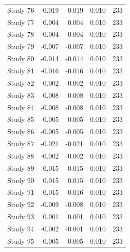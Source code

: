 \begin{table}[!h]
{\begin{tabular}[t]{rrrrr}
\hspace{1em}Study 76 & 0.019 & 0.019 & 0.010 & 233\\
\hspace{1em}Study 77 & 0.004 & 0.004 & 0.010 & 233\\
\hspace{1em}Study 78 & 0.004 & 0.004 & 0.010 & 233\\
\hspace{1em}Study 79 & -0.007 & -0.007 & 0.010 & 233\\
\hspace{1em}Study 80 & -0.014 & -0.014 & 0.010 & 233\\
\hspace{1em}Study 81 & -0.016 & -0.016 & 0.010 & 233\\
\hspace{1em}Study 82 & -0.002 & -0.002 & 0.010 & 233\\
\hspace{1em}Study 83 & 0.008 & 0.008 & 0.010 & 233\\
\hspace{1em}Study 84 & -0.008 & -0.008 & 0.010 & 233\\
\hspace{1em}Study 85 & 0.005 & 0.005 & 0.010 & 233\\
\hspace{1em}Study 86 & -0.005 & -0.005 & 0.010 & 233\\
\hspace{1em}Study 87 & -0.021 & -0.021 & 0.010 & 233\\
\hspace{1em}Study 88 & -0.002 & -0.002 & 0.010 & 233\\
\hspace{1em}Study 89 & 0.015 & 0.015 & 0.010 & 233\\
\hspace{1em}Study 90 & 0.015 & 0.015 & 0.010 & 233\\
\hspace{1em}Study 91 & 0.015 & 0.016 & 0.010 & 233\\
\hspace{1em}Study 92 & -0.009 & -0.008 & 0.010 & 233\\
\hspace{1em}Study 93 & 0.001 & 0.001 & 0.010 & 233\\
\hspace{1em}Study 94 & -0.002 & -0.001 & 0.010 & 233\\
\hspace{1em}Study 95 & 0.005 & 0.005 & 0.010 & 233\\

\end{tabular}}
\end{table}
